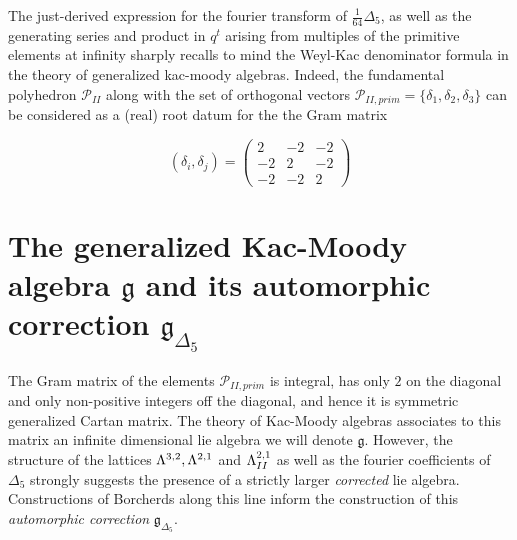 \documentclass[9pt]{amsart} \usepackage[utf8]{inputenc}
\newcommand{\Poly}{\mathcal{P}}
\newcommand{\bkm}{\mathfrak{g}}
\newcommand{\autcor}{\mathfrak{g}_{\Delta_5}}
\begin{document}
The just-derived expression for the fourier transform of $\frac{1}{64}
\Delta_5$, as well as the generating series and product in $q^t$ arising
from multiples of the primitive elements at infinity sharply recalls to
mind the Weyl-Kac denominator formula in the theory of generalized
kac-moody algebras. Indeed, the fundamental polyhedron $\Poly_{II}$
along with the set of orthogonal vectors $\Poly_{II,prim} =
\{\delta_1,\delta_2,\delta_3\}$ can be considered as a (real) root datum
for
the the Gram matrix

$$(\delta_i,\delta_j) = \begin{pmatrix}2 & -2 & -2\\-2 & 2 & -2\\-2 & -2
& 2\end{pmatrix}$$

\section{The generalized Kac-Moody algebra $\bkm$ and its automorphic
correction $\autcor$}

The Gram matrix of the elements $\Poly_{II,prim}$ is integral, has only $2$
on the diagonal and only non-positive integers off the diagonal, and
hence it is symmetric generalized Cartan matrix. The theory of Kac-Moody
algebras associates to this matrix an infinite dimensional lie algebra we will denote
$\bkm$. However, the structure of the lattices
$\Lambda^{3,2}, \Lambda^{2,1}$ and $\Lambda^{2,1}_{II}$ as well as the fourier
coefficients of $\Delta_5$ strongly suggests the
presence of a strictly larger \textit{corrected} lie algebra.
Constructions of Borcherds along this line inform the construction of
this \textit{automorphic correction} $\autcor$.
\end{document}
